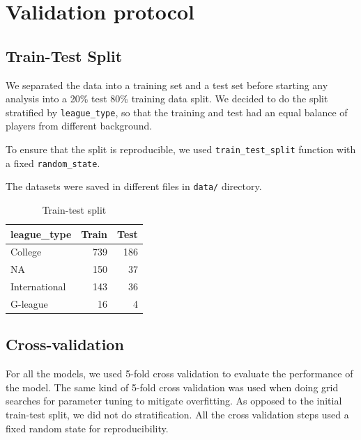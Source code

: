 
\section{Validation protocol}%
\label{sub:validation}

\subsection{Train-Test Split}%

We separated the data into a training set and a test set before starting any analysis
into a 20\% test 80\% training data split. We decided to do the split stratified by
\texttt{league\_type}, so that the training and test had an equal balance of players from
different background.

To ensure that the split is reproducible,
we used \texttt{train\_test\_split} function with a fixed \texttt{random\_state}.

The datasets were saved in different files in \texttt{data/} directory.

%
\begin{table}[htb]
\centering
\caption{Train-test split}
\label{tab:train-test-split}
\begin{tabular}{lrr}
  \toprule
  \textbf{league\_type} & \textbf{Train} & \textbf{Test} \\
  \midrule
  College        &  739  & 186 \\
  NA             &  150  &  37 \\
  International  &  143  &  36 \\
  G-league       &   16  &   4 \\
  \bottomrule
\end{tabular}
\end{table}

\subsection{Cross-validation}%
\label{ssub:cross-validation}

For all the models, we used 5-fold cross validation to evaluate the performance
of the model. The same kind of 5-fold cross validation was used when doing grid
searches for parameter tuning to mitigate overfitting. As opposed to the initial
train-test split, we did not do stratification. All the cross validation steps
used a fixed random state for reproducibility.

